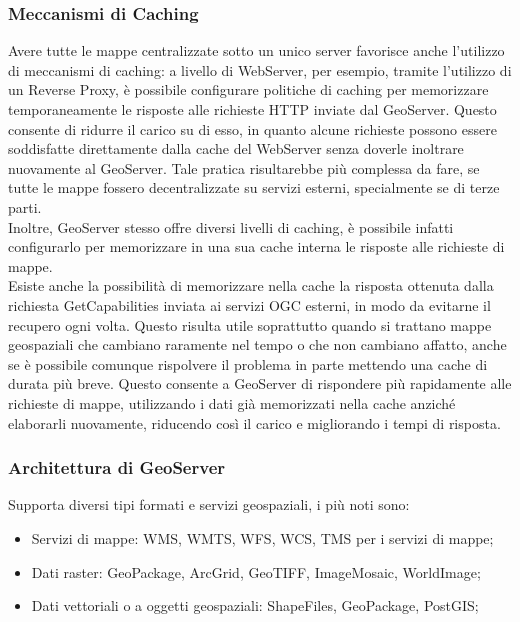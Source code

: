 \subsubsection{Meccanismi di Caching}

Avere tutte le mappe centralizzate sotto un unico server favorisce anche l'utilizzo di meccanismi di caching:
a livello di WebServer, per esempio, tramite l'utilizzo di un Reverse Proxy, è possibile configurare politiche di caching per memorizzare temporaneamente le risposte alle richieste HTTP inviate dal GeoServer. Questo consente di ridurre il carico su di esso, in quanto alcune richieste possono essere soddisfatte direttamente dalla cache del WebServer senza doverle inoltrare nuovamente al GeoServer. Tale pratica risultarebbe più complessa da fare, se tutte le mappe fossero decentralizzate su servizi esterni, specialmente se di terze parti.
\\Inoltre, GeoServer stesso offre diversi livelli di caching, è possibile infatti configurarlo per memorizzare in una sua cache interna le risposte alle richieste di mappe.
\\Esiste anche la possibilità di memorizzare nella cache la risposta ottenuta dalla richiesta GetCapabilities inviata ai servizi OGC esterni, in modo da evitarne il recupero ogni volta. Questo risulta utile soprattutto quando si trattano mappe geospaziali che cambiano raramente nel tempo o che non cambiano affatto, anche se è possibile comunque rispolvere il problema in parte mettendo una cache di durata più breve.
Questo consente a GeoServer di rispondere più rapidamente alle richieste di mappe, utilizzando i dati già memorizzati nella cache anziché elaborarli nuovamente, riducendo così il carico e migliorando i tempi di risposta.

\subsubsection{Architettura di GeoServer}

Supporta diversi tipi formati e servizi geospaziali, i più noti sono:

\begin{itemize}
      \item Servizi di mappe: WMS, WMTS, WFS, WCS, TMS per i servizi di mappe;
      \item Dati raster: GeoPackage, ArcGrid, GeoTIFF, ImageMosaic, WorldImage;
      \item Dati vettoriali o a oggetti geospaziali: ShapeFiles, GeoPackage, PostGIS;
\end{itemize}

